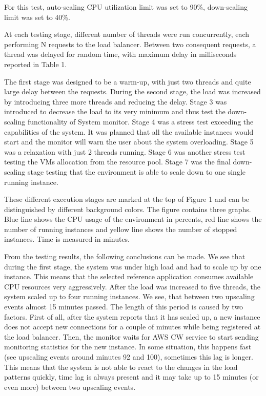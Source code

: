 \documentclass[conference]{IEEEtran}
\begin{document}
For this test, auto-scaling CPU utilization limit was set to 90\%, down-scaling limit was set to 40\%.

At each testing stage, different number of threads were run concurrently, each performing N requests to the load balancer. Between two consequent requests, a thread was delayed for random time, with maximum delay in milliseconds reported in Table 1.

The first stage was designed to be a warm-up, with just two threads and quite large delay between the requests. During the second stage, the load was increased by introducing three more threads and reducing the delay. Stage 3 was introduced to decrease the load to its very minimum and thus test the down-scaling functionality of System monitor. Stage 4 was a stress test exceeding the capabilities of the system. It was planned that all the available instances would start and the monitor will warn the user about the system overloading. Stage 5 was a relaxation with just 2 threads running. Stage 6 was another stress test testing the VMs allocation from the resource pool. Stage 7 was the final down-scaling stage testing that the environment is able to scale down to one single running instance.

These different execution stages are marked at the top of Figure 1 and can be distinguished by different background colors. The figure contains three graphs. Blue line shows the CPU usage of the environment in percents, red line shows the number of running instances and yellow line shows the number of stopped instances. Time is measured in minutes. 

From the testing results, the following conclusions can be made. We see that during the first stage, the system was under high load and had to scale up by one instance. This means that the selected reference application consumes available CPU resources very aggressively. After the load was increased to five threads, the system scaled up to four running instances. We see, that between two upscaling events almost 15 minutes passed. The length of this period is caused by two factors. First of all, after the system reports that it has scaled up, a new instance does not accept new connections for a couple of minutes while being registered at the load balancer. Then, the monitor waits for AWS CW service to start sending monitoring statistics for the new instance. In some situation, this happens fast (see upscaling events around minutes 92 and 100), sometimes this lag is longer. This means that the system is not able to react to the changes in the load patterns quickly, time lag is always present and it may take up to 15 minutes (or even more) between two upscaling events.
\end{document}

